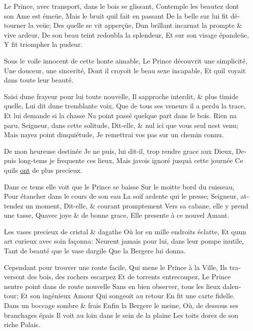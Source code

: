 \documentclass[14pt,a4paper]{memoir}
\newcommand{\ul}[1]{\uline{#1}}
\begin{document}
{{\begin{otherlanguage}{french}
{Le Prince, avec transport, dans le bois se glissant,} {Contemple les
beautez dont son Ame est émeüe,} {Mais le bruit qu\textquotesingle il
fait en passant} {De la belle sur lui fit détourner la veüe;} {Des
qu\textquotesingle elle se vit apperçüe,} {D\textquotesingle un brillant
incarnat la prompte \& vive ardeur,} {De son beau teint redoubla la
splendeur,} {Et sur son visage épandeüe,} {Y fit triompher la pudeur.}

{Sous le voile innocent de cette honte aimable,} {Le Prince découvrit
une simplicité,} {Une douceur, une sincerité,} {Dont il croyoit le beau
sexe incapable,} {Et qu\textquotesingle il voyait dans toute leur
beauté.}

{Saisi d\textquotesingle une frayeur pour lui toute nouvelle,} {Il
s\textquotesingle approche interdit, \& plus timide
qu\textquotesingle elle,} {Lui dit d\textquotesingle une tremblante
voix,} {Que de tous ses veneurs il a perdu la trace,} {Et lui demande si
la chasse} {N\textquotesingle a point passé quelque part dans le bois.}
{Rien n\textquotesingle a paru, Seigneur, dans cette solitude,}
{Dit-elle, \& nul ici que vous seul n\textquotesingle est venu; } {Mais
n\textquotesingle ayez point d\textquotesingle inquiétude,} {Je
remettrai vos pas sur un chemin connu.}

{De mon heureuse destinée} {Je ne puis, lui dit-il, trop rendre grace
aux Dieux,} {Depuis long-tems je frequente ces lieux,} {Mais
j\textquotesingle avois ignoré jusqu\textquotesingle à cette journée}
{Ce qu\textquotesingle ils \ul{ont} de plus precieux.}

{Dans ce tems elle voit que le Prince se baisse} {Sur le moitte bord du
ruisseau,} {Pour étancher dans le cours de son eau} {La soif ardente qui
le presse;} {Seigneur, attendez un moment,} {Dit-elle, \& courant
promptement} {Vers sa cabane, elle y prend une tasse,}
{Qu\textquotesingle avec joye \& de bonne grace,} {Elle presente à ce
nouvel Amant.}

{Les vases precieux de cristal \& d\textquotesingle agathe} {Où
l\textquotesingle or en mille endroits éclatte,} {Et
qu\textquotesingle un art curieux avec soin façonna:}
{N\textquotesingle eurent jamais pour lui, dans leur pompe inutile,}
{Tant de beauté que le vase d\textquotesingle argile} {Que la Bergere
lui donna.}

{Cependant pour trouver une route facile,} {Qui mene le Prince à la
Ville,} {Ils traversent des bois, des rochers escarpez} {Et de torrents
entrecoupez,} {Le Prince n\textquotesingle entre point dans de route
nouvelle} {Sans en bien observer, tous les lieux
d\textquotesingle alentour; } {Et son ingénieux Amour} {Qui songeoit au
retour} {En fit une carte fidelle.} {Dans un boccage sombre \& frais}
{Enfin la Bergere le meine,} {Où, de dessous ses branchages épais} {Il
voit au loin dans le sein de la plaine} {Les toits dorez de son riche
Palais.}


\end{otherlanguage}}}
\end{document}
